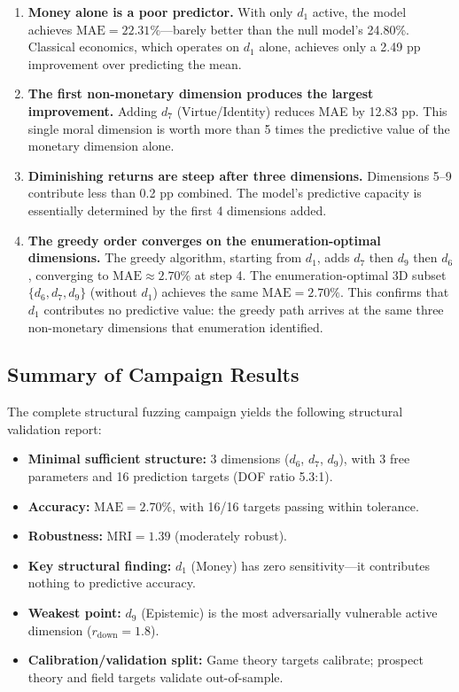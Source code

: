 \documentclass[12pt]{article}
\newcommand{\MAE}{\mathrm{MAE}}
\newcommand{\MRI}{\mathrm{MRI}}
\begin{document}
\begin{enumerate}
    \item \textbf{Money alone is a poor predictor.}  With only $d_1$ active, the model achieves $\MAE = 22.31\%$---barely better than the null model's 24.80\%.  Classical economics, which operates on $d_1$ alone, achieves only a 2.49 pp improvement over predicting the mean.

    \item \textbf{The first non-monetary dimension produces the largest improvement.}  Adding $d_7$ (Virtue/Identity) reduces MAE by 12.83 pp.  This single moral dimension is worth more than 5 times the predictive value of the monetary dimension alone.

    \item \textbf{Diminishing returns are steep after three dimensions.}  Dimensions 5--9 contribute less than 0.2 pp combined.  The model's predictive capacity is essentially determined by the first 4 dimensions added.

    \item \textbf{The greedy order converges on the enumeration-optimal dimensions.}  The greedy algorithm, starting from $d_1$, adds $d_7$ then $d_9$ then $d_6$, converging to $\MAE \approx 2.70\%$ at step 4.  The enumeration-optimal 3D subset $\{d_6, d_7, d_9\}$ (without $d_1$) achieves the same $\MAE = 2.70\%$.  This confirms that $d_1$ contributes no predictive value: the greedy path arrives at the same three non-monetary dimensions that enumeration identified.
\end{enumerate}

\subsection{Summary of Campaign Results}

The complete structural fuzzing campaign yields the following structural validation report:

\begin{itemize}
    \item \textbf{Minimal sufficient structure:} 3 dimensions ($d_6$, $d_7$, $d_9$), with 3 free parameters and 16 prediction targets (DOF ratio 5.3:1).
    \item \textbf{Accuracy:} $\MAE = 2.70\%$, with 16/16 targets passing within tolerance.
    \item \textbf{Robustness:} $\MRI = 1.39$ (moderately robust).
    \item \textbf{Key structural finding:} $d_1$ (Money) has zero sensitivity---it contributes nothing to predictive accuracy.
    \item \textbf{Weakest point:} $d_9$ (Epistemic) is the most adversarially vulnerable active dimension ($r_{\mathrm{down}} = 1.8$).
    \item \textbf{Calibration/validation split:} Game theory targets calibrate; prospect theory and field targets validate out-of-sample.
\end{itemize}
\end{document}
